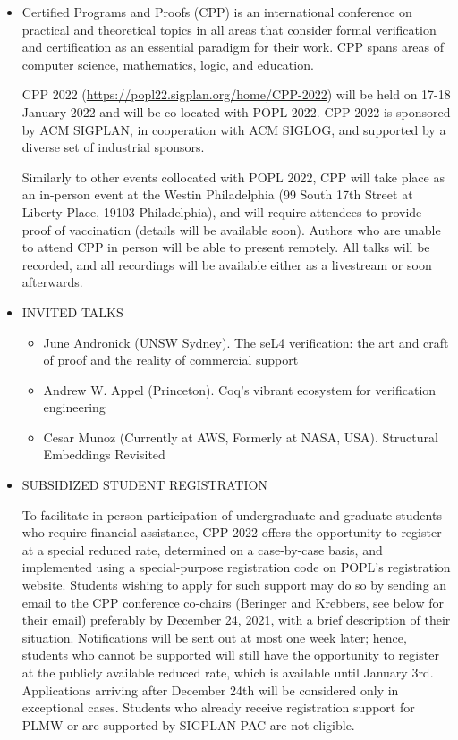 \documentclass[prodmode,acmtecs]{acmsmall} %
\begin{document}
\begin{itemize}\item  Certified Programs and Proofs (CPP) is an international conference on practical and theoretical topics in all areas that consider formal verification and certification as an essential paradigm for their work. CPP spans areas of computer science, mathematics, logic, and education. 
 
  CPP 2022 (\href{https://popl22.sigplan.org/home/CPP-2022}{https://popl22.sigplan.org/home/CPP-2022}) will be held on 17-18 January 2022 and will be co-located with POPL 2022. CPP 2022 is sponsored by ACM SIGPLAN, in cooperation with ACM SIGLOG, and supported by a diverse set of industrial sponsors. 
 
  Similarly to other events collocated with POPL 2022, CPP will take place as an in-person event at the Westin Philadelphia (99 South 17th Street at Liberty Place, 19103 Philadelphia), and will require attendees to provide proof of vaccination (details will be available soon). Authors who are unable to attend CPP in person will be able to present remotely. All talks will be recorded, and all recordings will be available either as a livestream or soon afterwards. 
 
\item  INVITED TALKS 
 
\begin{itemize}\item  June Andronick (UNSW Sydney). The seL4 verification: the art and craft of proof and the reality of commercial support
\item  Andrew W. Appel (Princeton). Coq’s vibrant ecosystem for verification engineering
\item  Cesar Munoz (Currently at AWS, Formerly at NASA, USA). Structural Embeddings Revisited
\end{itemize} 
\item  SUBSIDIZED STUDENT REGISTRATION 
 
  To facilitate in-person participation of undergraduate and graduate students who require financial assistance, CPP 2022 offers the opportunity to register at a special reduced rate, determined on a case-by-case basis, and implemented using a special-purpose registration code on POPL's registration website. Students wishing to apply for such support may do so by sending an email to the CPP conference co-chairs (Beringer and Krebbers, see below for their email) preferably by December 24, 2021, with a brief description of their situation. Notifications will be sent out at most one week later; hence, students who cannot be supported will still have the opportunity to register at the publicly available reduced rate, which is available until January 3rd. Applications arriving after December 24th will be considered only in exceptional cases. Students who already receive registration support for PLMW or are supported by SIGPLAN PAC are not eligible. 
 

\end{itemize}
\end{document}
